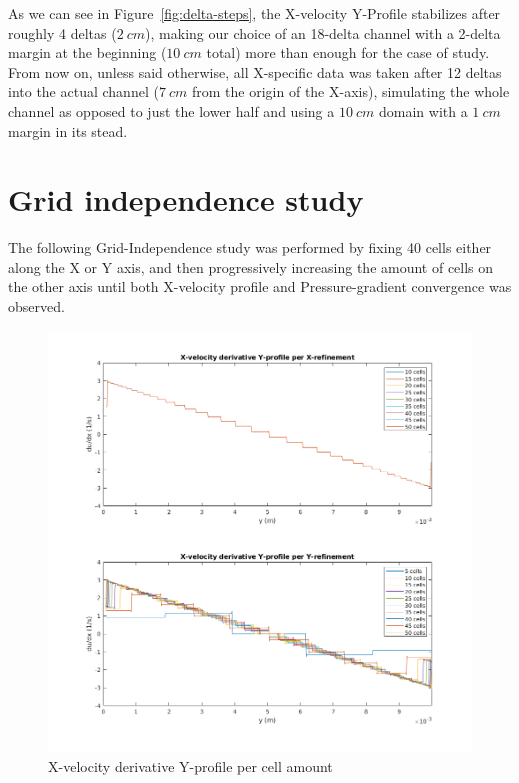 \documentclass[12pt]{article}
\begin{document}
        As we can see in Figure~\ref{fig:delta-steps}, the X-velocity Y-Profile stabilizes after roughly 4 deltas ($ 2 \: cm $), making our choice of an 18-delta channel with a 2-delta margin at the beginning ($ 10 \: cm $ total) more than enough for the case of study. From now on, unless said otherwise, all X-specific data was taken after 12 deltas into the actual channel ($ 7 \: cm $ from the origin of the X-axis), simulating the whole channel as opposed to just the lower half and using a \( 10 \: cm \) domain with a \( 1 \: cm \) margin in its stead.

\section{Grid independence study} \label{sec:independence}

        The following Grid-Independence study was performed by fixing 40 cells either along the X or Y axis, and then progressively increasing the amount of cells on the other axis until both X-velocity profile and Pressure-gradient convergence was observed.

        \begin{figure}[!ht]
                \includegraphics[width=\textwidth]{Grid_Ind_U_Profiles.png}
                \centering
                \caption{X-velocity derivative Y-profile per cell amount}
                \label{fig:grid_ind_u}
        \end{figure}
\end{document}
